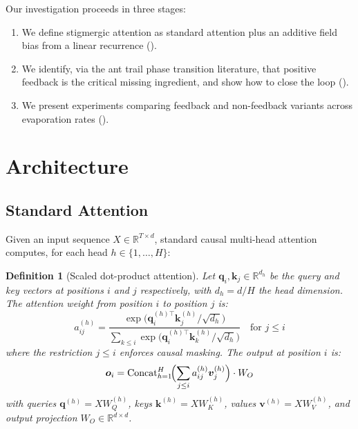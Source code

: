 \documentclass[11pt,a4paper]{article}
\newtheorem{definition}{Definition}
\newcommand{\R}{\mathbb{R}}
\newcommand{\q}{\bm{q}}
\newcommand{\K}{\bm{k}}
\newcommand{\vv}{\bm{v}}
\begin{document}
Our investigation proceeds in three stages:
\begin{enumerate}
    \item We define stigmergic attention as standard attention plus an
          additive field bias from a linear recurrence ().
    \item We identify, via the ant trail phase transition literature, that
          positive feedback is the critical missing ingredient, and show
          how to close the loop ().
    \item We present experiments comparing feedback and non-feedback
          variants across evaporation rates ().
\end{enumerate}


\section{Architecture}
\label{sec:architecture}

\subsection{Standard Attention}

Given an input sequence $X \in \R^{T \times d}$, standard causal
multi-head attention computes, for each head $h \in \{1, \ldots, H\}$:

\begin{definition}[Scaled dot-product attention]
\label{def:attention}
Let $\q_i, \K_j \in \R^{d_h}$ be the query and key vectors at positions
$i$ and $j$ respectively, with $d_h = d / H$ the head dimension. The
attention weight from position $i$ to position $j$ is:
\begin{equation}
    a_{ij}^{(h)} = \frac{\exp\!\bigl(\q_i^{(h)\top} \K_j^{(h)} / \sqrt{d_h}\bigr)}
                        {\sum_{k \leq i} \exp\!\bigl(\q_i^{(h)\top} \K_k^{(h)} / \sqrt{d_h}\bigr)}
    \quad \text{for } j \leq i
\end{equation}
where the restriction $j \leq i$ enforces causal masking.
The output at position $i$ is:
\begin{equation}
    \bm{o}_i = \text{Concat}_{h=1}^{H}\!\Bigl(\sum_{j \leq i} a_{ij}^{(h)} \vv_j^{(h)}\Bigr) \cdot W_O
\end{equation}
with queries $\q^{(h)} = X W_Q^{(h)}$, keys $\K^{(h)} = X W_K^{(h)}$,
values $\vv^{(h)} = X W_V^{(h)}$, and output projection $W_O \in \R^{d \times d}$.
\end{definition}
\end{document}
